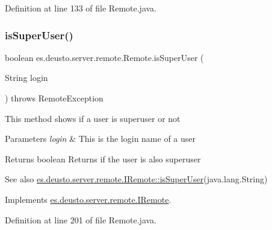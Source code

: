 Definition at line 133 of file Remote.\+java.

\mbox{\label{classes_1_1deusto_1_1server_1_1remote_1_1_remote_ac7d2e76813b61b5a9fcf33d89b6e08c4}} 
\subsubsection{\texorpdfstring{is\+Super\+User()}{isSuperUser()}}
{\footnotesize\ttfamily boolean es.\+deusto.\+server.\+remote.\+Remote.\+is\+Super\+User (\begin{DoxyParamCaption}\item[{String}]{login }\end{DoxyParamCaption}) throws Remote\+Exception}

This method shows if a user is superuser or not 
\begin{DoxyParams}{Parameters}
{\em login} & This is the login name of a user \\
\hline
\end{DoxyParams}
\begin{DoxyReturn}{Returns}
boolean Returns if the user is also superuser 
\end{DoxyReturn}
\begin{DoxySeeAlso}{See also}
\hyperlink{interfacees_1_1deusto_1_1server_1_1remote_1_1_i_remote_a488f8b57271876e219af445345428d73}{es.\+deusto.\+server.\+remote.\+I\+Remote\+::is\+Super\+User}(java.\+lang.\+String) 
\end{DoxySeeAlso}


Implements \hyperlink{interfacees_1_1deusto_1_1server_1_1remote_1_1_i_remote_a488f8b57271876e219af445345428d73}{es.\+deusto.\+server.\+remote.\+I\+Remote}.



Definition at line 201 of file Remote.\+java.

\mbox{\label{classes_1_1deusto_1_1server_1_1remote_1_1_remote_a1c8e0153dd9b3f6d5499eb6d01e48bbe}} 
